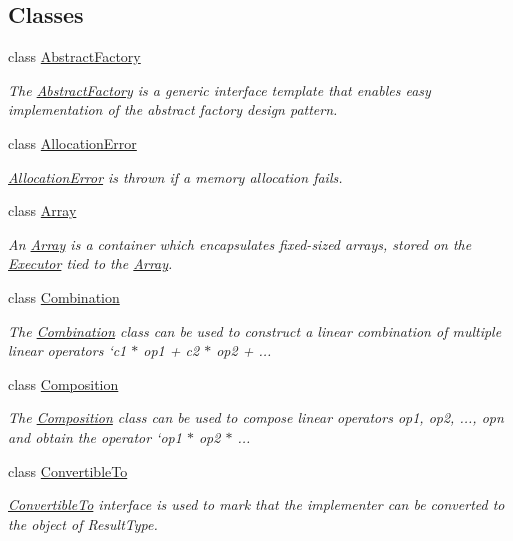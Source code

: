 \subsection*{Classes}
\begin{DoxyCompactItemize}
\item 
class \hyperlink{classgko_1_1AbstractFactory}{Abstract\+Factory}
\begin{DoxyCompactList}\small\item\em The \hyperlink{classgko_1_1AbstractFactory}{Abstract\+Factory} is a generic interface template that enables easy implementation of the abstract factory design pattern. \end{DoxyCompactList}\item 
class \hyperlink{classgko_1_1AllocationError}{Allocation\+Error}
\begin{DoxyCompactList}\small\item\em \hyperlink{classgko_1_1AllocationError}{Allocation\+Error} is thrown if a memory allocation fails. \end{DoxyCompactList}\item 
class \hyperlink{classgko_1_1Array}{Array}
\begin{DoxyCompactList}\small\item\em An \hyperlink{classgko_1_1Array}{Array} is a container which encapsulates fixed-\/sized arrays, stored on the \hyperlink{classgko_1_1Executor}{Executor} tied to the \hyperlink{classgko_1_1Array}{Array}. \end{DoxyCompactList}\item 
class \hyperlink{classgko_1_1Combination}{Combination}
\begin{DoxyCompactList}\small\item\em The \hyperlink{classgko_1_1Combination}{Combination} class can be used to construct a linear combination of multiple linear operators `c1 $\ast$ op1 + c2 $\ast$ op2 + ... \end{DoxyCompactList}\item 
class \hyperlink{classgko_1_1Composition}{Composition}
\begin{DoxyCompactList}\small\item\em The \hyperlink{classgko_1_1Composition}{Composition} class can be used to compose linear operators {\ttfamily op1, op2, ..., opn} and obtain the operator `op1 $\ast$ op2 $\ast$ ... \end{DoxyCompactList}\item 
class \hyperlink{classgko_1_1ConvertibleTo}{Convertible\+To}
\begin{DoxyCompactList}\small\item\em \hyperlink{classgko_1_1ConvertibleTo}{Convertible\+To} interface is used to mark that the implementer can be converted to the object of Result\+Type. \end{DoxyCompactList}\item 

\end{DoxyCompactItemize}
